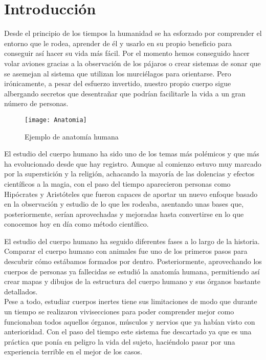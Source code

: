 \chapter{Introducción\label{sec:introduccion}}

Desde el principio de los tiempos la humanidad se ha esforzado por comprender el entorno que le rodea, aprender de él y usarlo en su propio beneficio para conseguir así hacer su vida más fácil. Por el momento hemos conseguido hacer volar aviones gracias a la observación de los pájaros o crear sistemas de sonar que se asemejan al sistema que utilizan los murciélagos para orientarse. Pero irónicamente, a pesar del esfuerzo invertido, nuestro propio cuerpo sigue albergando secretos que desentrañar que podrían facilitarle la vida a un gran número de personas.
\begin{wrapfigure}{r}{0.25\textwidth} %
    \centering
    \texttt{[image: Anatomia]}
    \caption{Ejemplo de anatomía humana}
\end{wrapfigure}

El estudio del cuerpo humano ha sido uno de los temas más polémicos y que más ha evolucionado desde que hay registro. Aunque al comienzo estuvo muy marcado por la superstición y la religión, achacando la mayoría de las dolencias y efectos científicos a la magia, con el paso del tiempo aparecieron personas como Hipócrates y Aristóteles que fueron capaces de aportar un nuevo enfoque basado en la observación y estudio de lo que les rodeaba, asentando unas bases que, posteriormente, serían aprovechadas y mejoradas hasta convertirse en lo que conocemos hoy en día como método científico.

El estudio del cuerpo humano ha seguido diferentes fases a lo largo de la historia. Comparar el cuerpo humano con animales fue uno de los primeros pasos para descubrir cómo estábamos formados por dentro. Posteriormente, aprovechando los cuerpos de personas ya fallecidas se estudió la anatomía humana, permitiendo así crear mapas y dibujos de la estructura del cuerpo humano y sus órganos bastante detallados.
\\Pese a todo, estudiar cuerpos inertes tiene sus limitaciones de modo que durante un tiempo se realizaron vivisecciones para poder comprender mejor como funcionaban todos aquellos órganos, músculos y nervios que ya habían visto con anterioridad. Con el paso del tiempo este sistema fue descartado ya que es una práctica que ponía en peligro la vida del sujeto, haciéndolo pasar por una experiencia terrible en el mejor de los casos.

